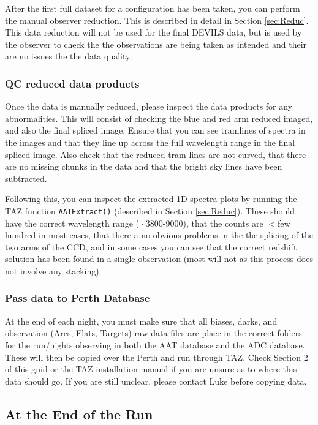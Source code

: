 \documentclass[12pt]{article}
\begin{document}
After the first full dataset for a configuration has been taken, you can perform the manual observer reduction. This is described in detail in Section \ref{sec:Reduc}. This data reduction will not be used for the final DEVILS data, but is used by the observer to check the the observations are being taken as intended and their are no issues the the data quality.  

\subsubsection{QC reduced data products}

Once the data is manually reduced, please inspect the data products for any abnormalities. This will consist of checking the blue and red arm reduced imaged, and also the final spliced image. Ensure that you can see tramlines of spectra in the images and that they line up across the full wavelength range in the final spliced image. Also check that the reduced tram lines are not curved, that there are no missing chunks in the data and that the bright sky lines have been subtracted. 

Following this, you can inspect the extracted 1D spectra plots by running the TAZ function \texttt{AATExtract()} (described in Section \ref{sec:Reduc}). These should have the correct wavelength range ($\sim$3800-9000), that the counts are $<$few hundred in most cases, that there a no obvious problems in the the splicing of the two arms of the CCD, and in some cases you can see that the correct redshift solution has been found in a single observation (most will not as this process does not involve any stacking).


\subsubsection{Pass data to Perth Database}

At the end of each night, you must make sure that all biases, darks, and observation (Arcs, Flats, Targets) raw data files are place in the correct folders for the run/nights observing in both the AAT database and the ADC database. These will then be copied over the Perth and run through TAZ. Check Section 2 of this guid or the TAZ installation manual if you are unsure as to where this data should go. If you are still unclear, please contact Luke before copying data.  


\subsection{At the End of the Run}
\end{document}
